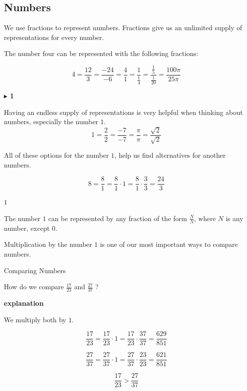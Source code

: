 \documentclass{ximera}
\begin{document}
\subsection*{Numbers} 



We use fractions to represent numbers.  Fractions give us an unlimited supply of representations for every number.

The number four can be represented with the following fractions:

\[
4 = \frac{12}{3} = \frac{-24}{-6} = \frac{4}{1} = \frac{1}{\tfrac{1}{4}} = \frac{\tfrac{1}{5}}{\tfrac{1}{20}} = \frac{100\pi}{25\pi}
\]








\textbf{\textcolor{purple!85!blue}{$\blacktriangleright$ 1}} 



Having an endless supply of representations is very helpful when thinking about numbers, especially the number $1$. \\


\[
1 = \frac{2}{2} = \frac{-7}{-7} = \frac{\pi}{\pi} = \frac{\sqrt{2}}{\sqrt{2}} 
\]


All of these options for the number $1$, help us find alternatives for another numbers.


\[
8 = \frac{8}{1} = \frac{8}{1} \cdot 1 = \frac{8}{1} \cdot \frac{3}{3} = \frac{24}{3}
\]




\begin{idea} \textbf{\textcolor{blue!55!black}{$1$}} 

The number $1$ can be represented by any fraction of the form $\frac{N}{N}$, where $N$ is any number, except $0$.


\end{idea}







Multiplication by the number $1$ is one of our most important ways to compare numbers.




\begin{example} Comparing Numbers

How do we compare $\frac{17}{23}$ and $\frac{27}{37}$ ? 


\textbf{\textcolor{red!75!green}{explanation}} 



We multiply both by $1$.


\[
\frac{17}{23} = \frac{17}{23} \cdot 1 = \frac{17}{23} \cdot \frac{37}{37} = \frac{629}{851}
\]


\[
\frac{27}{37} = \frac{27}{37} \cdot 1 = \frac{27}{37} \cdot \frac{23}{23} = \frac{621}{851}
\]



\[
\frac{17}{23} > \frac{27}{37}
\]


\end{example}
\end{document}
